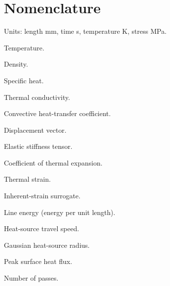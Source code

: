 \section*{Nomenclature}
\label{sec:nomenclature}

\noindent Units: length \si{mm}, time \si{s}, temperature \si{K}, stress \si{MPa}.

\begin{description}[leftmargin=2.6cm,style=nextline]
  \item[$T$] Temperature.
  \item[$\rho$] Density.
  \item[$c_p$] Specific heat.
  \item[$k$] Thermal conductivity.
  \item[$h_{\mathrm{conv}}$] Convective heat-transfer coefficient.
  \item[$\vect{u}$] Displacement vector.
  \item[$\tensor{D}$] Elastic stiffness tensor.
  \item[$\alpha$] Coefficient of thermal expansion.
  \item[$\boldsymbol{\varepsilon}^{\mathrm{th}}$] Thermal strain.
  \item[$\boldsymbol{\varepsilon}^{\mathrm{inh}}$] Inherent-strain surrogate.
  \item[$E$] Line energy (energy per unit length).
  \item[$v$] Heat-source travel speed.
  \item[$r_0$] Gaussian heat-source radius.
  \item[$q_0$] Peak surface heat flux.
  \item[$N$] Number of passes.
\end{description}
